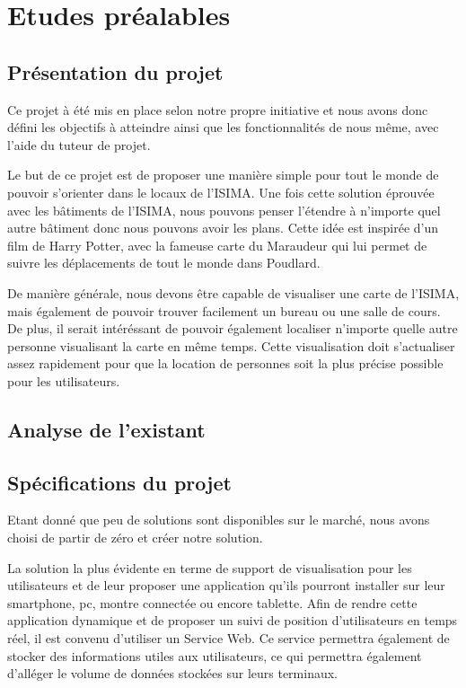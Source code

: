 \section{Etudes préalables}

\subsection{Présentation du projet}

Ce projet à été mis en place selon notre propre initiative et nous avons donc défini les objectifs à atteindre ainsi que les fonctionnalités de nous même, avec l'aide du tuteur de projet.

Le but de ce projet est de proposer une manière simple pour tout le monde de pouvoir s'orienter dans le locaux de l'ISIMA. Une fois cette solution éprouvée avec les bâtiments de l'ISIMA, nous pouvons penser l'étendre à n'importe quel autre bâtiment donc nous pouvons avoir les plans. Cette idée est inspirée d'un film de Harry Potter, avec la fameuse carte du Maraudeur qui lui permet de suivre les déplacements de tout le monde dans Poudlard.

De manière générale, nous devons être capable de visualiser une carte de l'ISIMA, mais également de pouvoir trouver facilement un bureau ou une salle de cours. De plus, il serait intéréssant de pouvoir également localiser n'importe quelle autre personne visualisant la carte en même temps.
Cette visualisation doit s'actualiser assez rapidement pour que la location de personnes soit la plus précise possible pour les utilisateurs.

\subsection{Analyse de l'existant}

\subsection{Spécifications du projet}

Etant donné que peu de solutions sont disponibles sur le marché, nous avons choisi de partir de zéro et créer notre solution.

La solution la plus évidente en terme de support de visualisation pour les utilisateurs et de leur proposer une application qu'ils pourront installer sur leur smartphone, pc, montre connectée ou encore tablette.
Afin de rendre cette application dynamique et de proposer un suivi de position d'utilisateurs en temps réel, il est convenu d'utiliser un Service Web. Ce service permettra également de stocker des informations utiles aux utilisateurs, ce qui permettra également d'alléger le volume de données stockées sur leurs terminaux.

